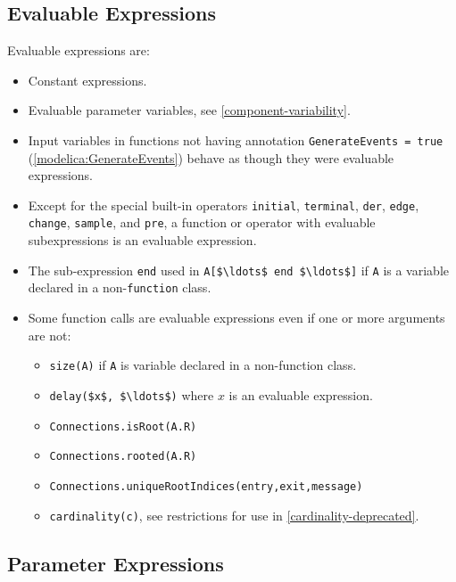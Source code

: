 \subsection{Evaluable Expressions}\label{evaluable-expressions}

Evaluable expressions are:
\begin{itemize}
\item
  Constant expressions.
\item
  Evaluable parameter variables, see \cref{component-variability}.
\item
  Input variables in functions not having annotation \lstinline!GenerateEvents = true! (\cref{modelica:GenerateEvents}) behave as though they were evaluable expressions.
\item
  Except for the special built-in operators \lstinline!initial!, \lstinline!terminal!, \lstinline!der!, \lstinline!edge!, \lstinline!change!, \lstinline!sample!, and \lstinline!pre!, a function or operator with evaluable subexpressions is an evaluable expression.
\item
  The sub-expression \lstinline!end! used in \lstinline!A[$\ldots$ end $\ldots$]! if \lstinline!A! is a variable declared in a non-\lstinline!function! class.
\item
  Some function calls are evaluable expressions even if one or more arguments are not:
  \begin{itemize}
  \item
    \lstinline!size(A)! if \lstinline!A! is variable declared in a non-function class.
  \item
    \lstinline!delay($x$, $\ldots$)! where $x$ is an evaluable expression.
  \item
    \lstinline!Connections.isRoot(A.R)!
  \item
    \lstinline!Connections.rooted(A.R)!
  \item
    \lstinline!Connections.uniqueRootIndices(entry,exit,message)!
  \item
    \lstinline!cardinality(c)!, see restrictions for use in \cref{cardinality-deprecated}.
  \end{itemize}
\end{itemize}

\subsection{Parameter Expressions}\label{parameter-expressions}

